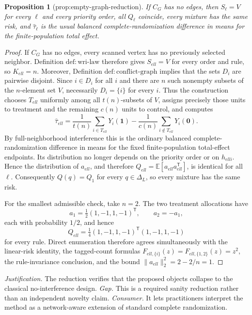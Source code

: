 \documentclass{article}
\newtheorem{proposition}{Proposition}
\begin{document}
\begin{proposition}[prop:empty-graph-reduction]\label{prop:empty-graph-reduction}
If \(C_G\) has no edges, then \(S_{\ell}=V\) for every \(\ell\) and every priority order, all \(Q_{\ell}\) coincide, every mixture has the same risk, and \(\widehat\tau_{\ell}\) is the usual balanced complete-randomization difference in means for the finite-population total effect.
\end{proposition}
\begin{proof}
If \(C_G\) has no edges, every scanned vertex has no previously selected neighbor.  Definition \(\mathrm{def:wri\mbox{-}law}\) therefore gives \(S_{ell}=V\) for every order and rule, so \(K_{ell}=n\).  Moreover, Definition \(\mathrm{def:conflict\mbox{-}graph}\) implies that the sets \(D_i\) are pairwise disjoint.  Since \(i\in D_i\) for all \(i\) and there are \(n\) such nonempty subsets of the \(n\)-element set \(V\), necessarily \(D_i=\{i\}\) for every \(i\).  Thus the construction chooses \(T_{ell}\) uniformly among all \(t(n)\)-subsets of \(V\), assigns precisely those units to treatment and the remaining \(c(n)\) units to control, and computes
\[
 \widehat\tau_{ell}
 =\frac1{t(n)}\sum_{i\in T_{ell}}Y_i(\mathbf 1)
  -\frac1{c(n)}\sum_{i\notin T_{ell}}Y_i(\mathbf 0).
\]
By full-neighborhood interference this is the ordinary balanced complete-randomization difference in means for the fixed finite-population total-effect endpoints.  Its distribution no longer depends on the priority order or on \(h_{ell i}\).  Hence the distribution of \(a_{ell}\), and therefore \(Q_{ell}=\mathbb E[a_{ell}a_{ell}^{\mathsf T}]\), is identical for all \(\ell\).  Consequently \(Q(q)=Q_1\) for every \(q\in\Delta_L\), so every mixture has the same risk.

For the smallest admissible check, take \(n=2\).  The two treatment allocations have
\[
 a_1=\tfrac12(1,-1,1,-1)^{\mathsf T},
 \qquad a_2=-a_1,
\]
each with probability \(1/2\), and hence
\[
 Q_{ell}=\tfrac14(1,-1,1,-1)^{\mathsf T}(1,-1,1,-1)
\]
for every rule.  Direct enumeration therefore agrees simultaneously with the linear-risk identity, the tagged-count formulas \(F_{ell,\{i\}}(z)=F_{ell,\{1,2\}}(z)=z^2\), the rule-invariance conclusion, and the bound \(\|a_{ell}\|_2^2=2-2/n=1\).
\end{proof}
\par\smallskip\noindent \textit{Justification.} The reduction verifies that the proposed objects collapse to the classical no-interference design. \textit{Gap.} This is a required sanity reduction rather than an independent novelty claim. \textit{Consumer.} It lets practitioners interpret the method as a network-aware extension of standard complete randomization.
\end{document}
